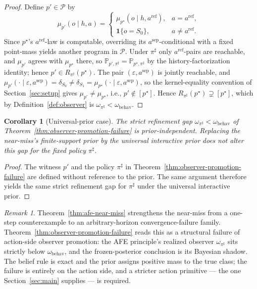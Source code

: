 \documentclass[11pt]{article}
\newtheorem{corollary}[theorem]{Corollary}
\theoremstyle{definition}
\theoremstyle{remark}
\newtheorem{remark}[theorem]{Remark}
\newcommand{\Pcal}{\mathcal{P}}
\newcommand{\Prob}{\mathbb{P}}
\newcommand{\one}{\mathbf{1}}
\begin{document}
\begin{proof}
Define $p'\in\Pcal$ by
\[
\mu_{p'}(o\mid h,a)=
\begin{cases}
\mu_{p^\star}(o\mid h,a^{\mathrm{ref}}), & a=a^{\mathrm{ref}},\\
\one\{o=S_0\}, & a\neq a^{\mathrm{ref}}.
\end{cases}
\]
Since $p^\star$'s $a^{\mathrm{ref}}$-law is computable, overriding its $a^{\mathrm{sep}}$-conditional with a fixed point-mass yields another program in $\Pcal$. Under $\pi^\sharp$ only $a^{\mathrm{ref}}$-pairs are reachable, and $\mu_{p'}$ agrees with $\mu_{p^\star}$ there, so $\Prob_{p',\pi^\sharp}=\Prob_{p^\star,\pi^\sharp}$ by the history-factorization identity; hence $p'\in R_{\pi^\sharp}(p^\star)$. The pair $(\varepsilon,a^{\mathrm{sep}})$ is jointly reachable, and $\mu_{p'}(\cdot\mid\varepsilon,a^{\mathrm{sep}})=\delta_{S_0}\neq\delta_{S_1}=\mu_{p^\star}(\cdot\mid\varepsilon,a^{\mathrm{sep}})$, so the kernel-equality convention of Section~\ref{sec:setup} gives $\mu_{p'}\neq\mu_{p^\star}$, i.e., $p'\notin[p^\star]$. Hence $R_{\pi^\sharp}(p^\star)\supsetneq[p^\star]$, which by Definition~\ref{def:observer} is $\omega_{\pi^\sharp}<\omega_{\mathrm{behav}}$.
\end{proof}

\begin{corollary}[Universal-prior case]
\label{cor:observer-promotion-universal}
The strict refinement gap $\omega_{\pi^\sharp}<\omega_{\mathrm{behav}}$ of Theorem~\ref{thm:observer-promotion-failure} is prior-independent. Replacing the near-miss's finite-support prior by the universal interactive prior does not alter this gap for the fixed policy $\pi^\sharp$.
\end{corollary}

\begin{proof}
The witness $p'$ and the policy $\pi^\sharp$ in Theorem~\ref{thm:observer-promotion-failure} are defined without reference to the prior. The same argument therefore yields the same strict refinement gap for $\pi^\sharp$ under the universal interactive prior.
\end{proof}

\begin{remark}
\label{rem:near-miss}
Theorem~\ref{thm:afe-near-miss} strengthens the near-miss from a one-step counterexample to an arbitrary-horizon convergence-failure family. Theorem~\ref{thm:observer-promotion-failure} reads this as a structural failure of action-side observer promotion: the AFE principle's realized observer $\omega_{\pi^\sharp}$ sits strictly below $\omega_{\mathrm{behav}}$, and the frozen-posterior conclusion is its Bayesian shadow. The belief rule is exact and the prior assigns positive mass to the true class; the failure is entirely on the action side, and a stricter action primitive --- the one Section~\ref{sec:main} supplies --- is required.
\end{remark}
\end{document}
